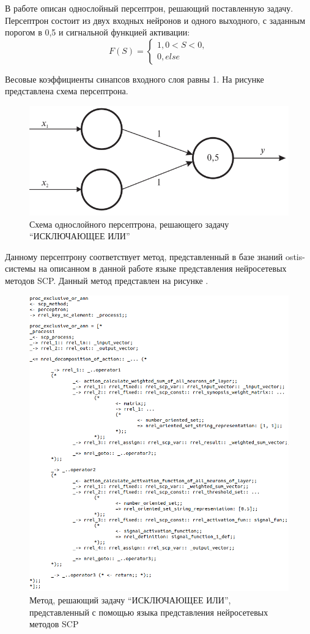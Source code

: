 В работе  описан однослойный персептрон, решающий поставленную задачу. Персептрон состоит из двух входных нейронов и одного выходного, с заданным порогом в 0,5 и сигнальной функцией активации:
\begin{equation*}
	F(S) =
	\begin{cases}
		1, 0 < S < 0,\\
		0, else
	\end{cases}
\end{equation*}

Весовые коэффициенты синапсов входного слоя равны 1. На рисунке  представлена схема персептрона.

\begin{figure}
	\centering
	\includegraphics[width=0.5\linewidth]{author/part3/figures/strong_or_ann.png}
	\caption{Схема однослойного персептрона, решающего задачу ``ИСКЛЮЧАЮЩЕЕ ИЛИ''}
	\label{fig:strong_or_ann}
\end{figure}

Данному персептрону соответствует метод, представленный в базе знаний ostis-системы на описанном в данной работе языке представления нейросетевых методов SCP. Данный метод представлен на рисунке .

\begin{figure}
	\centering
	\includegraphics[width=0.95\linewidth]{author/part3/figures/exclusive_or_ann_scp.png}
	\caption{Метод, решающий задачу ``ИСКЛЮЧАЮЩЕЕ ИЛИ'', представленный с помощью языка представления нейросетевых методов SCP}
	\label{fig:exclusive_or_ann_scp}
\end{figure}

